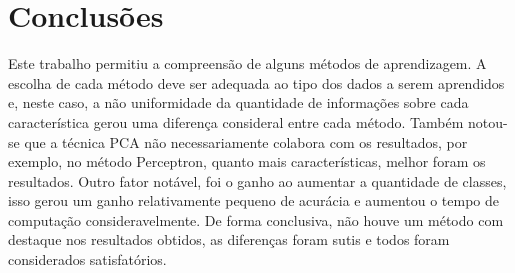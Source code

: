 \documentclass[12pt]{article}
\begin{document}

\section{Conclusões}
	Este trabalho permitiu a compreensão de alguns métodos de aprendizagem. A escolha de cada método deve ser adequada ao tipo dos dados a serem aprendidos e, neste caso, a não uniformidade da quantidade de informações sobre cada característica gerou uma diferença consideral entre cada método. Também notou-se que a técnica PCA não necessariamente colabora com os resultados, por exemplo, no método Perceptron, quanto mais características, melhor foram os resultados. Outro fator notável, foi o ganho ao aumentar a quantidade de classes, isso gerou um ganho relativamente pequeno de acurácia e aumentou o tempo de computação consideravelmente. De forma conclusiva, não houve um método com destaque nos resultados obtidos, as diferenças foram sutis e todos foram considerados satisfatórios.



\end{document}

